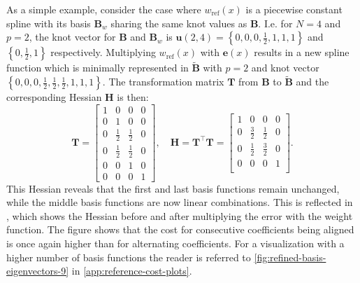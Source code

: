 As a simple example, consider the case where $w_\text{ref}(x)$ is a piecewise constant spline with its basis $\mathbf B_w$ sharing the same knot values as $\mathbf B$. I.e. for $N=4$ and $p=2$, the knot vector for $\mathbf B$ and $\mathbf B_w$ is $\mathbf u(2,4) = \left\{0, 0, 0, \frac{1}{2}, 1, 1, 1\right\}$ and $\left\{0, \frac{1}{2}, 1\right\}$ respectively. Multiplying $w_\text{ref}(x)$ with $\mathbf e(x)$ results in a new spline function which is minimally represented in $\mathbf{\tilde B}$ with $p=2$ and knot vector $\left\{0, 0, 0, \frac{1}{2}, \frac{1}{2}, \frac{1}{2}, 1, 1, 1\right\}$.  The transformation matrix $\mathbf T$ from $\mathbf B$ to $\mathbf{\tilde B}$ and the corresponding Hessian $\mathbf H$ is then:
\begin{equation*}
    \mathbf T = \begin{bmatrix}
        1 & 0 & 0 & 0 \\
        0 & 1 & 0 & 0 \\
        0 & \frac{1}{2} & \frac{1}{2} & 0 \\
        0 & \frac{1}{2} & \frac{1}{2} & 0 \\
        0 & 0 & 1 & 0 \\
        0 & 0 & 0 & 1
    \end{bmatrix},
    \quad
    \mathbf H = \mathbf T^\top \mathbf T =
    \begin{bmatrix}
        1 & 0 & 0 & 0 \\
        0 & \frac{3}{2} & \frac{1}{2} & 0 \\
        0 & \frac{1}{2} & \frac{3}{2} & 0 \\
        0 & 0 & 0 & 1 \\
    \end{bmatrix}.
\end{equation*}
This Hessian reveals that the first and last basis functions remain unchanged, while the middle basis functions are now linear combinations. This is reflected in , which shows the Hessian before and after multiplying the error with the weight function. The figure shows that the cost for consecutive coefficients being aligned is once again higher than for alternating coefficients. For a visualization with a higher number of basis functions the reader is referred to \cref{fig:refined-basis-eigenvectors-9} in \cref{app:reference-cost-plots}.

